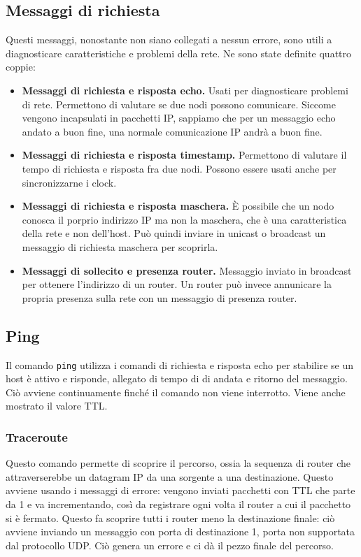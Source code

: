     \subsection{Messaggi di richiesta}
        Questi messaggi, nonostante non siano collegati a nessun errore, sono utili a diagnosticare caratteristiche e problemi della rete. Ne sono state definite quattro coppie:
        \begin{itemize}
            \item \textbf{Messaggi di richiesta e risposta echo.} Usati per diagnosticare problemi di rete. Permettono di valutare se due nodi possono comunicare. Siccome vengono incapsulati in pacchetti IP, sappiamo che per un messaggio echo andato a buon fine, una normale comunicazione IP andrà a buon fine.
            
            \item \textbf{Messaggi di richiesta e risposta timestamp.} Permettono di valutare il tempo di richiesta e risposta fra due nodi. Possono essere usati anche per sincronizzarne i clock.
            
            \item \textbf{Messaggi di richiesta e risposta maschera.} È possibile che un nodo conosca il porprio indirizzo IP ma non la maschera, che è una caratteristica della rete e non dell'host. Può quindi inviare in unicast o broadcast un messaggio di richiesta maschera per scoprirla.
            
            \item \textbf{Messaggi di sollecito e presenza router.} Messaggio inviato in broadcast per ottenere l'indirizzo di un router. Un router può invece annunicare la propria presenza sulla rete con un messaggio di presenza router.
        \end{itemize}
        
    \subsection{Ping}
        Il comando \texttt{ping} utilizza i comandi di richiesta e risposta echo per stabilire se un host è attivo e risponde, allegato di tempo di di andata e ritorno del messaggio. Ciò avviene continuamente finché il comando non viene interrotto. Viene anche mostrato il valore TTL.
        
        \subsubsection{Traceroute}
            Questo comando permette di scoprire il percorso, ossia la sequenza di router che attraverserebbe un datagram IP da una sorgente a una destinazione. Questo avviene usando i messaggi di errore: vengono inviati pacchetti con TTL che parte da 1 e va incrementando, così da registrare ogni volta il router a cui il pacchetto si è fermato. Questo fa scoprire tutti i router meno la destinazione finale: ciò avviene inviando un messaggio con porta di destinazione 1, porta non supportata dal protocollo UDP. Ciò genera un errore e ci dà il pezzo finale del percorso.